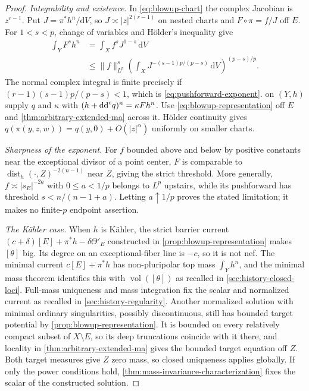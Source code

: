 \begin{proof}
\emph{Integrability and existence.} In \eqref{eq:blowup-chart} the complex Jacobian is $z^{r-1}$. Put $J=\pi^*h^n/\mathrm{d}V$, so $J\asymp|z|^{2(r-1)}$ on nested charts and $F\circ\pi=f/J$ off $E$. For $1<s<p$, change of variables and H\"older's inequality give
\begin{align}\label{eq:pushforward-holder}
 \int_YF^s h^n
 &=\int_X f^sJ^{1-s}\,\mathrm{d}V\\
 &\leq\|f\|_{L^p}^s
 \left(\int_XJ^{-(s-1)p/(p-s)}\,\mathrm{d}V\right)^{(p-s)/p}.
\end{align}
The normal complex integral is finite precisely if $(r-1)(s-1)p/(p-s)<1$, which is \eqref{eq:pushforward-exponent}.  on $(Y,h)$ supply $q$ and $\kappa$ with $(h+\mathrm{dd}^{\mathrm{c}} q)^n=\kappa Fh^n$. Use \eqref{eq:blowup-representation} off $E$ and \cref{thm:arbitrary-extended-ma} across it. H\"older continuity gives $q(\pi(y,z,w))=q(y,0)+O(|z|^\alpha)$ uniformly on smaller charts.

\emph{Sharpness of the exponent.} For $f$ bounded above and below by positive constants near the exceptional divisor of a point center, $F$ is comparable to $\operatorname{dist}_h(\cdot,Z)^{-2(n-1)}$ near $Z$, giving the strict threshold. More generally, $f\asymp|s_E|^{-2a}$ with $0\leq a<1/p$ belongs to $L^p$ upstairs, while its pushforward has threshold $s<n/(n-1+a)$. Letting $a\uparrow1/p$ proves the stated limitation; it makes no finite-$p$ endpoint assertion.

\emph{The K\"ahler case.} When $h$ is K\"ahler, the strict barrier current $(c+\delta)[E]+\pi^*h-\delta\Theta'_E$ constructed in \cref{prop:blowup-representation} makes $[\theta]$ big. Its degree on an exceptional-fiber line is $-c$, so it is not nef. The minimal current $c[E]+\pi^*h$ has non-pluripolar top mass $\int_Yh^n$, and the minimal mass theorem identifies this with $\operatorname{vol}([\theta])$ as recalled in \cref{sec:history-closed-loci}. Full-mass uniqueness and mass integration fix the scalar and normalized current as recalled in \cref{sec:history-regularity}. Another normalized solution with minimal ordinary singularities, possibly discontinuous, still has bounded target potential by \cref{prop:blowup-representation}. It is bounded on every relatively compact subset of $X\setminus E$, so its deep truncations coincide with it there, and locality in \cref{thm:arbitrary-extended-ma} gives the bounded target equation off $Z$. Both target measures give $Z$ zero mass, so closed uniqueness applies globally. If only the power conditions hold, \cref{thm:mass-invariance-characterization} fixes the scalar of the constructed solution.
\end{proof}

